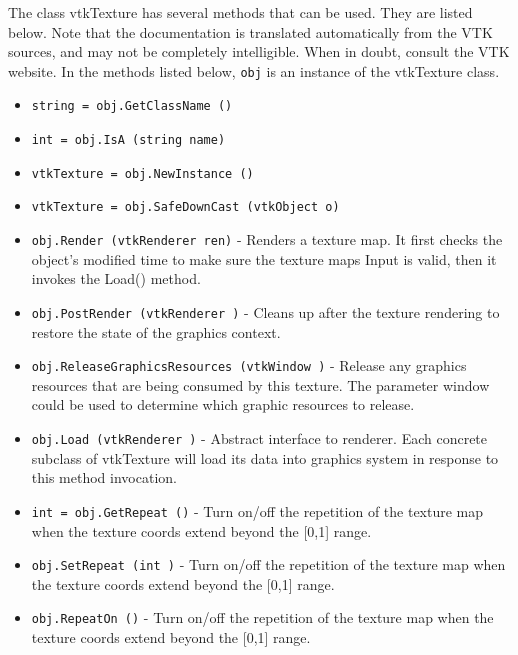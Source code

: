 The class vtkTexture has several methods that can be used.
  They are listed below.
Note that the documentation is translated automatically from the VTK sources,
and may not be completely intelligible.  When in doubt, consult the VTK website.
In the methods listed below, \verb|obj| is an instance of the vtkTexture class.
\begin{itemize}
\item  \verb|string = obj.GetClassName ()|

\item  \verb|int = obj.IsA (string name)|

\item  \verb|vtkTexture = obj.NewInstance ()|

\item  \verb|vtkTexture = obj.SafeDownCast (vtkObject o)|

\item  \verb|obj.Render (vtkRenderer ren)| -  Renders a texture map. It first checks the object's modified time
 to make sure the texture maps Input is valid, then it invokes the 
 Load() method.

\item  \verb|obj.PostRender (vtkRenderer )| -  Cleans up after the texture rendering to restore the state of the
 graphics context.

\item  \verb|obj.ReleaseGraphicsResources (vtkWindow )| -  Release any graphics resources that are being consumed by this texture.
 The parameter window could be used to determine which graphic
 resources to release.

\item  \verb|obj.Load (vtkRenderer )| -  Abstract interface to renderer. Each concrete subclass of 
 vtkTexture will load its data into graphics system in response 
 to this method invocation.

\item  \verb|int = obj.GetRepeat ()| -  Turn on/off the repetition of the texture map when the texture
 coords extend beyond the [0,1] range.

\item  \verb|obj.SetRepeat (int )| -  Turn on/off the repetition of the texture map when the texture
 coords extend beyond the [0,1] range.

\item  \verb|obj.RepeatOn ()| -  Turn on/off the repetition of the texture map when the texture
 coords extend beyond the [0,1] range.


\end{itemize}
